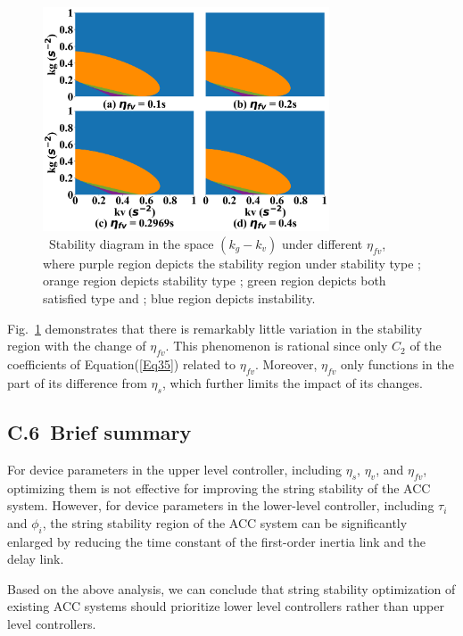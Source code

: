 \documentclass[journal]{IEEEtran}
\begin{document}
\begin{figure}
  \centering
  \includegraphics[width=8.5cm]{figs/fig12.png}
  \caption{~Stability diagram in the space $(k_g-k_v)$ under different $\eta_{fv}$, where purple region depicts the stability region under stability type \uppercase\expandafter{}; orange region depicts stability type \uppercase\expandafter{}; green region depicts both satisfied type \uppercase\expandafter{} and \uppercase\expandafter{}; blue region depicts instability.}
  \label{fig12}
\end{figure}

Fig.~\ref{fig12} demonstrates that there is remarkably little variation in the stability region with the change of $\eta_{fv}$. This phenomenon is rational since only $C_2$ of the coefficients of Equation(\ref{Eq35}) related to $\eta_{fv}$. Moreover, $\eta_{fv}$ only functions in the part of its difference from $\eta_s$, which further limits the impact of its changes.

\subsection*{C.6~Brief summary}

For device parameters in the upper level controller, including $\eta_s$, $\eta_v$, and $\eta_{fv}$, optimizing them is not effective for improving the string stability of the ACC system. However, for device parameters in the lower-level controller, including $\tau_i$ and $\phi_i$, the string stability region of the ACC system can be significantly enlarged by reducing the time constant of the first-order inertia link and the delay link.

Based on the above analysis, we can conclude that string stability optimization of existing ACC systems should prioritize lower level controllers rather than upper level controllers.
\end{document}
